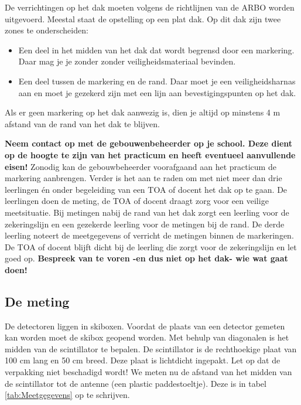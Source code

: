 De verrichtingen op het dak moeten volgens de richtlijnen van de ARBO worden uitgevoerd.
Meestal staat de opstelling op een plat dak. Op dit dak zijn twee zones
te onderscheiden:

\begin{itemize}
    \item Een deel in het midden van het dak dat wordt begrensd door een
          markering. Daar mag je je zonder zonder
          veiligheidsmateriaal bevinden.
    \item Een deel tussen de markering en de rand. Daar moet je
          een veiligheidsharnas aan en moet je gezekerd zijn met een lijn aan
          bevestigingspunten op het dak.
\end{itemize}
Als er geen markering op het dak aanwezig is, dien je altijd op minstens 4 m afstand van de rand van het dak te blijven.

\textbf{Neem contact op met de gebouwenbeheerder op je school. Deze
dient op de hoogte te zijn van het practicum en heeft eventueel
aanvullende eisen!} Zonodig kan de gebouwbeheerder voorafgaand aan het practicum de markering aanbrengen. 
Verder is het aan te raden om met niet meer dan drie
leerlingen \'en onder begeleiding van een TOA of docent het dak op te gaan.
De leerlingen doen de meting, de TOA of docent draagt zorg voor een
veilige meetsituatie. Bij metingen nabij de rand van het dak zorgt een leerling voor
de zekeringslijn en een gezekerde leerling voor de metingen bij de rand. De derde leerling noteert de meetgegevens of verricht de metingen binnen de markeringen. De TOA of docent blijft dicht bij de leerling die zorgt
voor de zekeringslijn en let goed op. \textbf{Bespreek van te voren -en
dus niet op het dak- wie wat gaat doen!}


\subsection{De meting}

De detectoren liggen in skiboxen. Voordat de plaats van een detector
gemeten kan worden moet de skibox geopend worden. Met behulp van
diagonalen is het midden van de scintillator te bepalen. De scintillator
is de rechthoekige plaat van 100 cm lang en 50 cm breed. Deze plaat is
lichtdicht ingepakt. Let op dat de verpakking niet beschadigd wordt! We
meten nu de afstand van het midden van de scintillator tot de \gps
antenne (een plastic paddestoeltje). Deze is in tabel
\ref{tab:Meetgegevens} op te schrijven.

